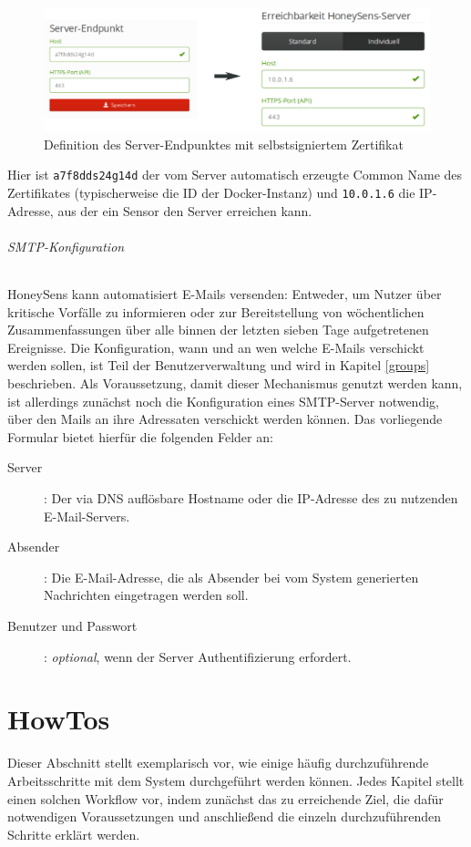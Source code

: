 \documentclass[12pt]{article}
\begin{document}
\begin{figure}[h]
				\centering
				\includegraphics[width=\textwidth]{./graphics/endpoint-selfsigned.png}
				\caption{Definition des Server-Endpunktes mit selbstsigniertem Zertifikat}
				\label{fig:endpoint-selfsigned}
\end{figure}

Hier ist \verb|a7f8dds24g14d| der vom Server automatisch erzeugte Common Name des Zertifikates (typischerweise die ID der Docker-Instanz) und \verb|10.0.1.6| die IP-Adresse, aus der ein Sensor den Server erreichen kann.

\paragraph{SMTP-Konfiguration}
HoneySens kann automatisiert E-Mails versenden: Entweder, um Nutzer über kritische Vorfälle zu informieren oder zur Bereitstellung von wöchentlichen Zusammenfassungen über alle binnen der letzten sieben Tage aufgetretenen Ereignisse. Die Konfiguration, wann und an wen welche E-Mails verschickt werden sollen, ist Teil der Benutzerverwaltung und wird in Kapitel \ref{groups} beschrieben. Als Voraussetzung, damit dieser Mechanismus genutzt werden kann, ist allerdings zunächst noch die Konfiguration eines SMTP-Server notwendig, über den Mails an ihre Adressaten verschickt werden können. Das vorliegende Formular bietet hierfür die folgenden Felder an:

\begin{description}
				\item[Server]: Der via DNS auflösbare Hostname oder die IP-Adresse des zu nutzenden E-Mail-Servers.
				\item[Absender]: Die E-Mail-Adresse, die als Absender bei vom System generierten Nachrichten eingetragen werden soll.
				\item[Benutzer und Passwort]: \textit{optional}, wenn der Server Authentifizierung erfordert.
\end{description}

\newpage
\part{HowTos}
Dieser Abschnitt stellt exemplarisch vor, wie einige häufig durchzuführende Arbeitsschritte mit dem System durchgeführt werden können. Jedes Kapitel stellt einen solchen Workflow vor, indem zunächst das zu erreichende Ziel, die dafür notwendigen Voraussetzungen und anschließend die einzeln durchzuführenden Schritte erklärt werden.
\end{document}
